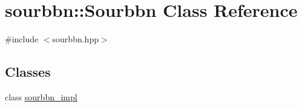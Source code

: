 \hypertarget{classsourbbn_1_1Sourbbn}{}\section{sourbbn\+:\+:Sourbbn Class Reference}
\label{classsourbbn_1_1Sourbbn}


{\ttfamily \#include $<$sourbbn.\+hpp$>$}

\subsection*{Classes}
\begin{DoxyCompactItemize}
\item 
class \hyperlink{classsourbbn_1_1Sourbbn_1_1sourbbn__impl}{sourbbn\+\_\+impl}
\end{DoxyCompactItemize}
